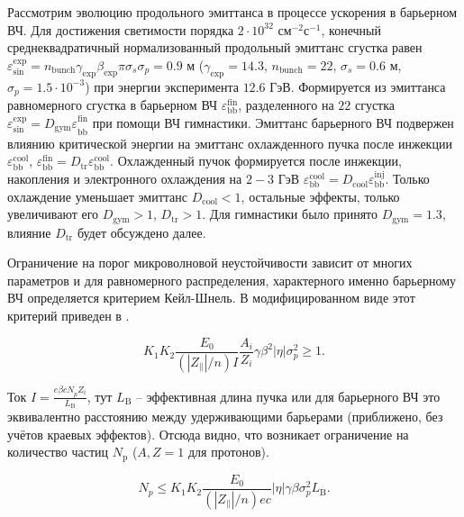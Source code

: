 \par Рассмотрим эволюцию продольного эмиттанса в процессе ускорения в барьерном ВЧ. 
Для достижения светимости порядка $2 \cdot 10^{32}$ см$^{-2}$с$^{-1}$, конечный среднеквадратичный нормализованный продольный эмиттанс сгустка равен $\varepsilon_{\textrm{sin}}^{\textrm{exp}}=n_{\textrm{bunch}}\gamma_{\textrm{exp}}\beta_{\textrm{exp}}\pi\sigma_s\sigma_p=0.9$ м ($\gamma_{\textrm{exp}}=14.3$, $n_{\textrm{bunch}}=22$, $\sigma_s=0.6$ м, $\sigma_p=1.5\cdot 10^{-3}$) при энергии эксперимента $12.6$ ГэВ. 
Формируется из эмиттанса равномерного сгустка в барьерном ВЧ $\varepsilon_{\textrm{bb}}^{\textrm{fin}}$, разделенного на $22$ сгустка $\varepsilon_{\textrm{sin}}^{\textrm{exp}}={D_{\textrm{gym}}\varepsilon}_{\textrm{bb}}^{\textrm{fin}}$ при помощи ВЧ гимнастики. 
Эмиттанс барьерного ВЧ подвержен влиянию критической энергии на эмиттанс охлажденного пучка после инжекции $\varepsilon_{\textrm{bb}}^{\textrm{cool}}$, $\varepsilon_{\textrm{bb}}^{\textrm{fin}}=D_{\textrm{tr}}\varepsilon_{\textrm{bb}}^{\textrm{cool}}$. 
Охлажденный пучок формируется после инжекции, накопления и электронного охлаждения на $2-3$ ГэВ $ \varepsilon_{\textrm{bb}}^{\textrm{cool}}=D_{\textrm{cool}}\varepsilon_{\textrm{bb}}^{\textrm{inj}}$. 
Только охлаждение уменьшает эмиттанс $D_{\textrm{cool}}<1$, остальные эффекты, только увеличивают его $D_{\textrm{gym}}>1$, $D_{\textrm{tr}}>1$. 
Для гимнастики было принято $D_{\textrm{gym}}=1.3$, влияние $D_{\textrm{tr}}$ будет обсуждено далее.
	
\par Ограничение на порог микроволновой неустойчивости зависит от многих параметров и для равномерного распределения, характерного именно барьерному ВЧ определяется критерием Кейл-Шнель. В модифицированном виде этот критерий приведен в \cite{zinkevich}.

\begin{equation}
K_1K_2\frac{E_0}{\left(\left|Z_\parallel\right|/n\right)I}\frac{A_i}{Z_i}\gamma\beta^2|\eta|\sigma_p^2\geq1.
\label{eq:microwave_instability}
\end{equation}

\noindent Ток $I=\frac{{e\beta cN}_pZ_i}{L_{\textrm{B}}}$, тут $L_{\textrm{B}}$ -- эффективная длина пучка или для барьерного ВЧ это эквивалентно расстоянию между удерживающими барьерами (приближено, без учётов краевых эффектов). Отсюда видно, что возникает ограничение на количество частиц $N_{\textrm{p}}$ ($A, Z=1$ для протонов).

\begin{equation}
N_p\le K_1K_2\frac{E_0}{\left(\left|Z_\parallel\right|/n\right)ec}\left|\eta\right|\gamma\beta\sigma_p^2L_{\textrm{B}}.
\label{eq:microwave_instability_1}
\end{equation}

